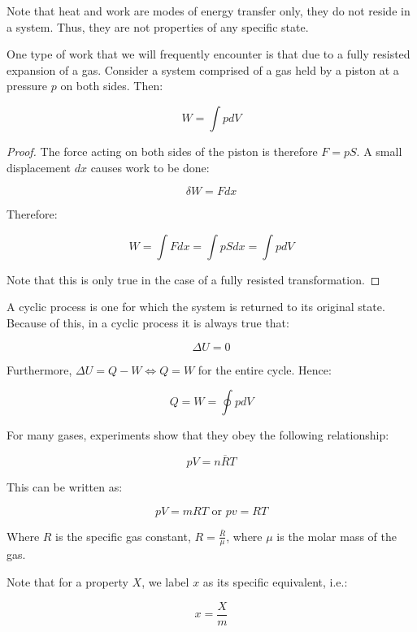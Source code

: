 \documentclass{article}
\begin{document}
Note that heat and work are modes of energy transfer only, they do not reside in a system. Thus, they are not properties of any specific state.

\begin{proposition}
    One type of work that we will frequently encounter is that due to a fully resisted expansion of a gas. Consider a system comprised of a gas held by a piston at a pressure $p$ on both sides. Then:

    \[ W = \int pdV \]
\end{proposition}

\begin{proof}
    The force acting on both sides of the piston is therefore $F = pS$. A small displacement $dx$ causes work to be done:

    \[ \delta W = Fdx \]

    Therefore:

    \[ W = \int Fdx = \int pSdx = \int pdV \]

    Note that this is only true in the case of a fully resisted transformation.
\end{proof}

\begin{definition}
    A cyclic process is one for which the system is returned to its original state. Because of this, in a cyclic process it is always true that:

    \[ \Delta U = 0 \]

    Furthermore, $\Delta U = Q - W \iff Q = W$ for the entire cycle. Hence:

    \[ Q = W = \oint pdV \]
\end{definition}

\begin{proposition}
    For many gases, experiments show that they obey the following relationship:

    \[ pV = n\overline{R}T \]

    This can be written as:

    \[ pV = mRT \text{   or   } pv = RT \]

    Where $R$ is the specific gas constant, $R = \frac{\overline{R}}{\mu}$, where $\mu$ is the molar mass of the gas.
\end{proposition}

Note that for a property $X$, we label $x$ as its specific equivalent, i.e.:

\[ x = \frac{X}{m} \]
\end{document}
